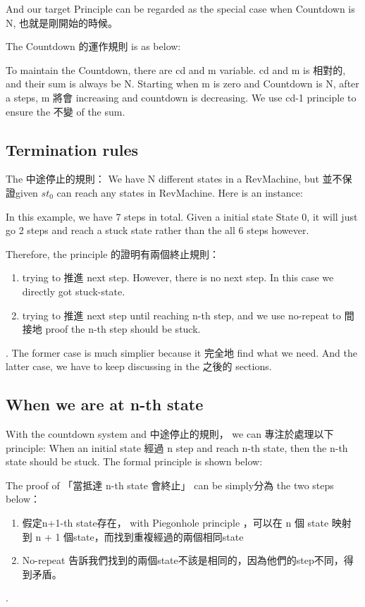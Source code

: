 
And our target Principle can be regarded as the special case when Countdown is N, 也就是剛開始的時候。

The Countdown 的運作規則 is as below:


To maintain the Countdown, there are cd and m variable.  cd and m is 相對的, and their sum is always be N.  Starting when m is zero and Countdown is N, after a steps, m 將會 increasing and countdown is decreasing.  We use cd-1 principle to ensure the 不變 of the sum.

\subsection{ Termination rules }
The 中途停止的規則：
We have N different states in a RevMachine, but 並不保證given $st_{0}$ can reach any states in RevMachine.  Here is an instance: 



In this example, we have 7 steps in total.  Given a initial state State 0, it will just go 2 steps and reach a stuck state rather than the all 6 steps however.

Therefore, the principle 的證明有兩個終止規則：
\begin{enumerate}[1.]
    \item trying to 推進 next step.  However, there is no next step.  In this case we directly got stuck-state. 
    \item trying to 推進 next step until reaching n-th step, and we use no-repeat to 間接地 proof the n-th step should be stuck.
\end{enumerate}.
The former case is much simplier because it 完全地 find what we need. 
And the latter case, we have to keep discussing in the 之後的 sections.

\subsection{ When we are at n-th state }

With the countdown system and 中途停止的規則， we can 專注於處理以下 principle:
When an initial state 經過 n step and reach n-th state, then the n-th state should be stuck.
The formal principle is shown below:




The proof of 「當抵達 n-th state 會終止」 can be simply分為 the two steps below：
\begin{enumerate}[1.]
    \item 假定n+1-th state存在， with Piegonhole principle ，可以在 n 個 state 映射到 n + 1 個state，而找到重複經過的兩個相同state
    \item No-repeat 告訴我們找到的兩個state不該是相同的，因為他們的step不同，得到矛盾。
\end{enumerate}.

